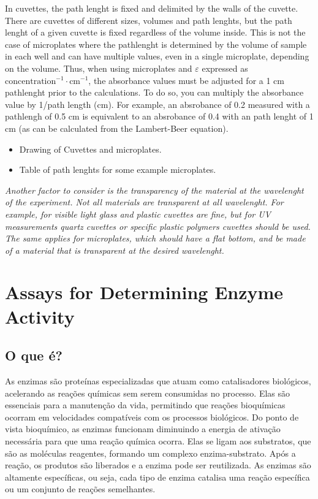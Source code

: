 \documentclass[
  9pt,
  american,
  a5paper,
  extrafontsizes,onecolumn,openright
  ]{memoir}
\providecommand{\tightlist}{%
  \setlength{\itemsep}{0pt}\setlength{\parskip}{0pt}}
\begin{document}
In cuvettes, the path lenght is fixed and delimited by the walls of the cuvette. There are cuvettes of different sizes, volumes and path lenghts, but the path lenght of a given cuvette is fixed regardless of the volume inside. This is not the case of microplates where the pathlenght is determined by the volume of sample in each well and can have multiple values, even in a single microplate, depending on the volume. Thus, when using microplates and \(\varepsilon\) expressed as \(\text{concentration}^{-1} \cdot \text{cm}^{-1}\), the absorbance values must be adjusted for a 1 cm pathlenght prior to the calculations. To do so, you can multiply the absorbance value by 1/path length (cm). For example, an absrobance of 0.2 measured with a pathlengh of 0.5 cm is equivalent to an absrobance of 0.4 with an path lenght of 1 cm (as can be calculated from the Lambert-Beer equation).

\begin{itemize}
\tightlist
\item
  Drawing of Cuvettes and microplates.
\item
  Table of path lenghts for some example microplates.
\end{itemize}

\begin{greybox}[frametitle = Note]
\emph{Another factor to consider is the transparency of the material at the wavelenght of the experiment. Not all materials are transparent at all wavelenght. For example, for visible light glass and plastic cuvettes are fine, but for UV measurements quartz cuvettes or specific plastic polymers cuvettes should be used. The same applies for microplates, which should have a flat bottom, and be made of a material that is transparent at the desired wavelenght.}

\end{greybox}

\chapter{Assays for Determining Enzyme Activity}\label{chapter3}

\section{O que é?}\label{o-que-uxe9}

As enzimas são proteínas especializadas que atuam como catalisadores biológicos, acelerando as reações químicas sem serem consumidas no processo. Elas são essenciais para a manutenção da vida, permitindo que reações bioquímicas ocorram em velocidades compatíveis com os processos biológicos. Do ponto de vista bioquímico, as enzimas funcionam diminuindo a energia de ativação necessária para que uma reação química ocorra. Elas se ligam aos substratos, que são as moléculas reagentes, formando um complexo enzima-substrato. Após a reação, os produtos são liberados e a enzima pode ser reutilizada. As enzimas são altamente específicas, ou seja, cada tipo de enzima catalisa uma reação específica ou um conjunto de reações semelhantes.
\end{document}
